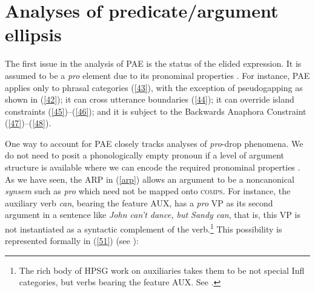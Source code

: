 \section{Analyses of predicate/argument ellipsis}
\label{sec-analyses-of-pred-ellipsis}

The first issue in the analysis of PAE is the status of the elided expression. It is assumed to be a
\textit{pro} element due to its pronominal properties \citep[see][]{Lobeck1995, Lopez2000, Kim2006,
  Aelbrecht2015, Ginzburg2018}. For instance, PAE applies only to phrasal categories (\ref{43}),
with the exception of pseudogapping as shown in (\ref{42}); it can cross utterance boundaries
(\ref{44}); it can override island constraints (\ref{45})--(\ref{46}); and it is subject to the
Backwards Anaphora Constraint (\ref{47})--(\ref{48}). 

\z
{}
\z
{}
\z
{}
\z
{}
\z
{}
\z
{}
\z

One way to account for PAE closely tracks analyses of \emph{pro}-drop phenomena. We do not need to posit a phonologically empty pronoun if a level of argument structure is
available where we can encode the required pronominal properties \citep[see][]{Bresnan1982a,Ginzburg:Sag:2000}. As we have seen, the ARP in (\ref{arp})
allows an 
argument to be a noncanonical  \emph{synsem}
such as \textit{pro} which need not be mapped onto \textsc{comps}. 
%
For instance, the auxiliary
verb \textit{can}, bearing the feature AUX, has a \textit{pro} VP as its second argument in a sentence like \textit{John can't dance, but Sandy can}, that is, this VP is not instantiated as a syntactic complement of the verb.\footnote{The rich body of HPSG work on  auxiliaries takes them to be not special Infl categories, but verbs bearing the feature AUX. See \citet{Kim:00, KS2002a, Sag:Wasow:Bender:2003, Sag2020a, kimmichaelis:2020}.} This possibility is represented formally in (\ref{51}) 
(see \citealt{Kim2006, ginzburg-miller-ellipsis-handbook}):

